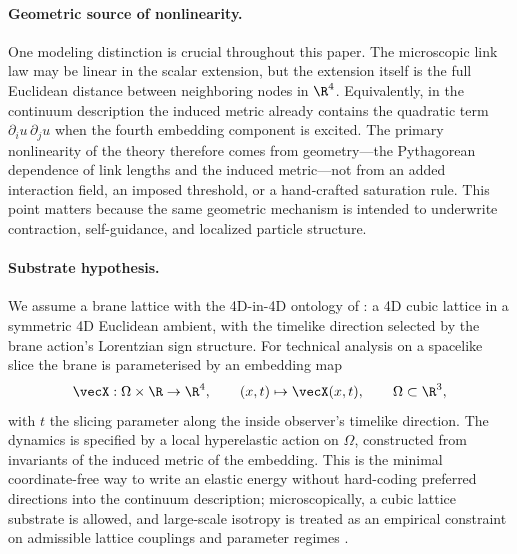\paragraph{Geometric source of nonlinearity.}
One modeling distinction is crucial throughout this paper.
The microscopic link law may be linear in the scalar extension, but the extension itself is the full Euclidean distance
between neighboring nodes in $\R^4$.
Equivalently, in the continuum description the induced metric already contains the quadratic term
$\partial_i u\,\partial_j u$ when the fourth embedding component is excited.
The primary nonlinearity of the theory therefore comes from geometry---the Pythagorean dependence of link lengths and the
induced metric---not from an added interaction field, an imposed threshold, or a hand-crafted saturation rule.
This point matters because the same geometric mechanism is intended to underwrite contraction, self-guidance, and
localized particle structure.

\paragraph{Substrate hypothesis.}
We assume a brane lattice with the 4D-in-4D ontology of : a 4D cubic lattice in a symmetric 4D Euclidean ambient, with the timelike direction selected by the brane action's Lorentzian sign structure.
For technical analysis on a spacelike slice the brane is parameterised by an embedding map
\begin{equation}
  \vecX:\Omega\times\R \to \R^4, \qquad (x,t)\mapsto \vecX(x,t), \qquad \Omega\subset\R^3,
  \label{eq:embedding-map}
\end{equation}
with $t$ the slicing parameter along the inside observer's timelike direction.
The dynamics is specified by a local hyperelastic action on $\Omega$, constructed from invariants of the
induced metric of the embedding.
This is the minimal coordinate-free way to write an elastic energy without hard-coding preferred directions into the
continuum description; microscopically, a cubic lattice substrate is allowed, and large-scale isotropy is treated as an
empirical constraint on admissible lattice couplings and parameter regimes \citep{Ogden1984,Holzapfel2000,DoCarmo1992}.

